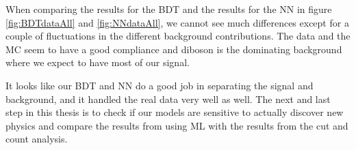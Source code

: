 When comparing the results for the BDT and the results for the NN in figure \ref{fig:BDTdataAll} and \ref{fig:NNdataAll}, we cannot see much differences except for a couple of fluctuations in the different background contributions. The data and the MC seem to have a good compliance and diboson is the dominating background where we expect to have most of our signal.

It looks like our BDT and NN do a good job in separating the signal and background, and it handled the real data very well as well. The next and last step in this thesis is to check if our models are sensitive to actually discover new physics and compare the results from using ML with the results from the cut and count analysis. 






































